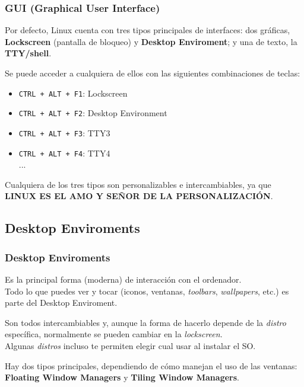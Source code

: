 \documentclass[aspectratio=43]{beamer}
\begin{document}
\begin{frame}
    \frametitle{GUI (Graphical User Interface)}
    Por defecto, Linux cuenta con tres tipos principales de interfaces: dos gráficas, \textbf{Lockscreen} (pantalla de bloqueo) y \textbf{Desktop Enviroment}; y una de texto, la \textbf{TTY/shell}.\newline

    Se puede acceder a cualquiera de ellos con las siguientes combinaciones de teclas:
    \begin{itemize}
        \item \texttt{CTRL + ALT + F1}: Lockscreen
        \item \texttt{CTRL + ALT + F2}: Desktop Environment
        \item \texttt{CTRL + ALT + F3}: TTY3
        \item \texttt{CTRL + ALT + F4}: TTY4\\
        ...\newline
    \end{itemize}
    
    Cualquiera de los tres tipos son personalizables e intercambiables, ya que \textbf{LINUX ES EL AMO Y SEÑOR DE LA PERSONALIZACIÓN}.
\end{frame}

\subsection{Desktop Enviroments}

\begin{frame}
    \frametitle{Desktop Enviroments}
    Es la principal forma (moderna) de interacción con el ordenador.\\
    Todo lo que puedes ver y tocar (iconos, ventanas, \textit{toolbars}, \textit{wallpapers}, etc.) es parte del Desktop Enviroment.\newline

    Son todos intercambiables y, aunque la forma de hacerlo depende de la \textit{distro} específica, normalmente se pueden cambiar en la \textit{lockscreen}.\\
    Algunas \textit{distros} incluso te permiten elegir cual usar al instalar el SO.\newline

    Hay dos tipos principales, dependiendo de cómo manejan el uso de las ventanas: \textbf{Floating Window Managers} y \textbf{Tiling Window Managers}.
\end{frame}
\end{document}
